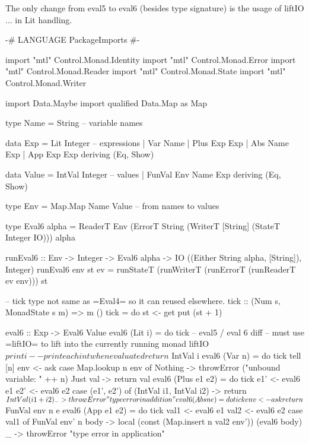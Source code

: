 The only change from eval5 to eval6 (besides type signature) is the usage of liftIO ... in Lit handling.

{-# LANGUAGE PackageImports #-}

import           "mtl" Control.Monad.Identity
import           "mtl" Control.Monad.Error
import           "mtl" Control.Monad.Reader
import           "mtl" Control.Monad.State
import           "mtl" Control.Monad.Writer

import                 Data.Maybe
import qualified       Data.Map as Map

type Name   =  String                -- variable names

data Exp    =  Lit  Integer          -- expressions
            |  Var  Name
            |  Plus Exp  Exp
            |  Abs  Name Exp
            |  App  Exp  Exp
            deriving (Eq, Show)

data Value  =  IntVal Integer        -- values
            |  FunVal Env Name Exp
            deriving (Eq, Show)

type Env    =  Map.Map Name Value    -- from names to values

type Eval6 alpha = ReaderT Env  (ErrorT String (WriterT [String] (StateT Integer IO))) alpha

runEval6           ::  Env -> Integer -> Eval6 alpha -> IO ((Either String alpha, [String]), Integer)
runEval6 env st ev  =  runStateT (runWriterT (runErrorT (runReaderT ev env))) st

-- tick type not same as =Eval4= so it can reused elsewhere.
tick :: (Num s, MonadState s m) => m ()
tick = do  st <- get
           put (st + 1)


eval6             :: Exp -> Eval6 Value
eval6 (Lit  i)     = do tick
                        -- eval5 / eval 6 diff
                        -- must use =liftIO= to lift into the currently running monad
                        liftIO $ print i -- print each int when evaluated
                        return $ IntVal i
eval6 (Var  n)     = do tick
                        tell [n]
                        env <- ask
                        case Map.lookup n env of
                            Nothing  -> throwError ("unbound variable: " ++ n)
                            Just val -> return val
eval6 (Plus e1 e2) = do tick
                        e1'  <- eval6 e1
                        e2'  <- eval6 e2
                        case (e1', e2') of
                            (IntVal i1, IntVal i2) -> return $ IntVal (i1 + i2)
                            _                      -> throwError "type error in addition"
eval6 (Abs  n  e)  = do tick
                        env <- ask
                        return $ FunVal env n e
eval6 (App  e1 e2) = do tick
                        val1  <- eval6 e1
                        val2  <- eval6 e2
                        case val1 of
                            FunVal env' n body -> local (const (Map.insert n val2 env')) (eval6 body)
                            _                  -> throwError "type error in application"

